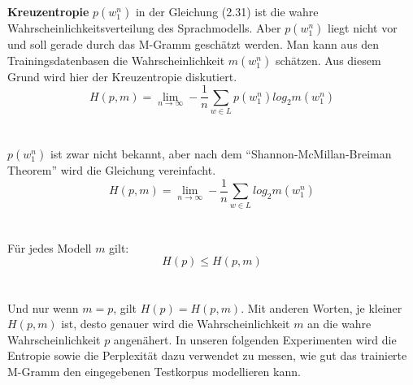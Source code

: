 \textbf{Kreuzentropie}
$p(w_{1}^{n})$ in der Gleichung (2.31) ist die wahre Wahrscheinlichkeitsverteilung des Sprachmodells. Aber $p(w_{1}^{n})$ liegt nicht vor und soll gerade durch das M-Gramm gesch\"atzt werden. Man kann aus den Trainingsdatenbasen die Wahrscheinlichkeit $m(w_{1}^{n})$ sch\"atzen. Aus diesem Grund  wird hier der Kreuzentropie diskutiert.
\begin{equation}
H(p,m)=\lim_{n\to\infty}-\frac{1}{n}\sum_{w\in L}p(w_{1}^{n})log_{2}m(w_{1}^{n})
\end{equation}
\\
\\
$p(w_{1}^{n})$ ist zwar nicht bekannt, aber nach dem "`Shannon-McMillan-Breiman Theorem"' wird die Gleichung vereinfacht. 
\begin{equation}
H(p,m)=\lim_{n\to\infty}-\frac{1}{n}\sum_{w\in L}log_{2}m(w_{1}^{n})
\end{equation}
\\
\\
F\"ur jedes Modell $m$ gilt: \\
\begin{equation}
H(p)\leq H(p,m)
\end{equation}
\\
\\
Und nur wenn $m=p$, gilt $H(p)=H(p,m)$. Mit anderen Worten, je kleiner $H(p,m)$ ist, desto genauer wird die Wahrscheinlichkeit $m$ an die wahre Wahrscheinlichkeit $p$ angen\"ahert.
In unseren folgenden Experimenten wird die Entropie sowie die Perplexit\"at dazu verwendet zu messen, wie gut das trainierte M-Gramm den eingegebenen Testkorpus modellieren kann.

